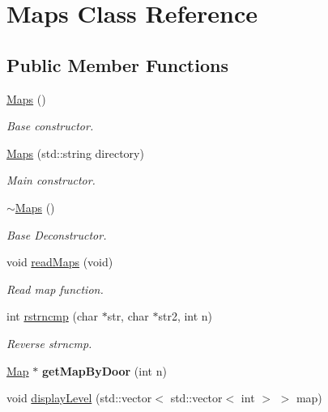 \hypertarget{class_maps}{\section{Maps Class Reference}
\label{class_maps}
}
\subsection*{Public Member Functions}
\begin{DoxyCompactItemize}
\item 
\hyperlink{class_maps_a87e73431397d1c36dcc2a95ef2b00732}{Maps} ()
\begin{DoxyCompactList}\small\item\em Base constructor. \end{DoxyCompactList}\item 
\hyperlink{class_maps_a9433b5dfd9a51fce5d2b950e97dacfbd}{Maps} (std\+::string directory)
\begin{DoxyCompactList}\small\item\em Main constructor. \end{DoxyCompactList}\item 
\hypertarget{class_maps_aa3fbced631bfb5f4d1fe541a8a29384f}{\hyperlink{class_maps_aa3fbced631bfb5f4d1fe541a8a29384f}{$\sim$\+Maps} ()}\label{class_maps_aa3fbced631bfb5f4d1fe541a8a29384f}

\begin{DoxyCompactList}\small\item\em Base Deconstructor. \end{DoxyCompactList}\item 
void \hyperlink{class_maps_a65ebe26294d69e741ee94d5530597886}{read\+Maps} (void)
\begin{DoxyCompactList}\small\item\em Read map function. \end{DoxyCompactList}\item 
int \hyperlink{class_maps_a1cb48ee4f0dff65981855143875b223b}{rstrncmp} (char $\ast$str, char $\ast$str2, int n)
\begin{DoxyCompactList}\small\item\em Reverse strncmp. \end{DoxyCompactList}\item 
\hypertarget{class_maps_a31edfac65329feb0a3ba37a7f93c8a8b}{\hyperlink{class_map}{Map} $\ast$ {\bfseries get\+Map\+By\+Door} (int n)}\label{class_maps_a31edfac65329feb0a3ba37a7f93c8a8b}

\item 
\hypertarget{class_maps_aeeafe517ee9170981f19f1fa1dac25a8}{void \hyperlink{class_maps_aeeafe517ee9170981f19f1fa1dac25a8}{display\+Level} (std\+::vector$<$ std\+::vector$<$ int $>$ $>$ map)}\label{class_maps_aeeafe517ee9170981f19f1fa1dac25a8}


\end{DoxyCompactItemize}
